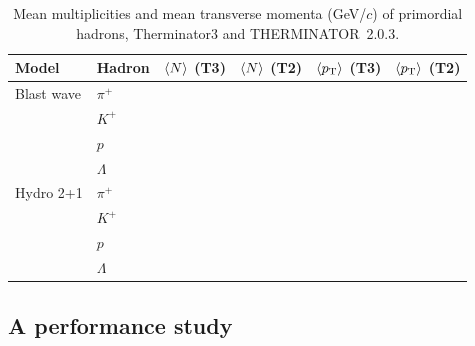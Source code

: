 \begin{table}[t]
  \caption{Mean multiplicities and mean transverse momenta (GeV/$c$) of primordial hadrons, Therminator3 and
  THERMINATOR~2.0.3. }
  \label{tab:t3-vs-t2}
  \centering
  \begin{tabular}{llcccc}
    \toprule
    Model & Hadron & $\left\langle N \right\rangle$ (T3) & $\left\langle N \right\rangle$ (T2) & $\left\langle p_{\mathrm{T}} \right\rangle$ (T3) & $\left\langle p_{\mathrm{T}} \right\rangle$ (T2) \\
    \midrule
    Blast wave & $\pi^+$   & & & & \\
               & $K^+$     & & & & \\
               & $p$       & & & & \\
               & $\Lambda$ & & & & \\
    \midrule
    Hydro 2+1  & $\pi^+$   & & & & \\
               & $K^+$     & & & & \\
               & $p$       & & & & \\
               & $\Lambda$ & & & & \\
    \bottomrule
  \end{tabular}
\end{table}

\subsection{A performance study}
\label{sec:example-performance}

